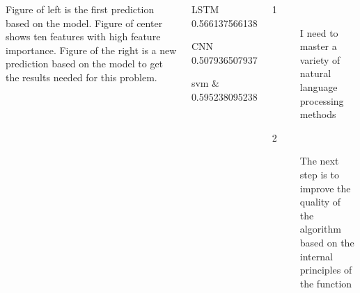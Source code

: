 \documentclass{tikzposter} %
\begin{document}
\begin{columns}
{
  Figure of left is the first prediction based on the model. Figure of center
shows ten features with high feature importance. Figure of the right is a new
prediction based on the model to get the results needed for this problem.

\begin{description}
      \item   LSTM           0.566137566138
      \item  CNN           0.507936507937
      \item svm           & 0.595238095238
\end{description}
}

{
  \begin{description}
  \item [1] I need to master a variety of natural language processing methods\\
  \item [2] The next step is to improve the quality of the algorithm based on the internal principles of the function
  \end{description}
}





\end{columns}
\end{document}
